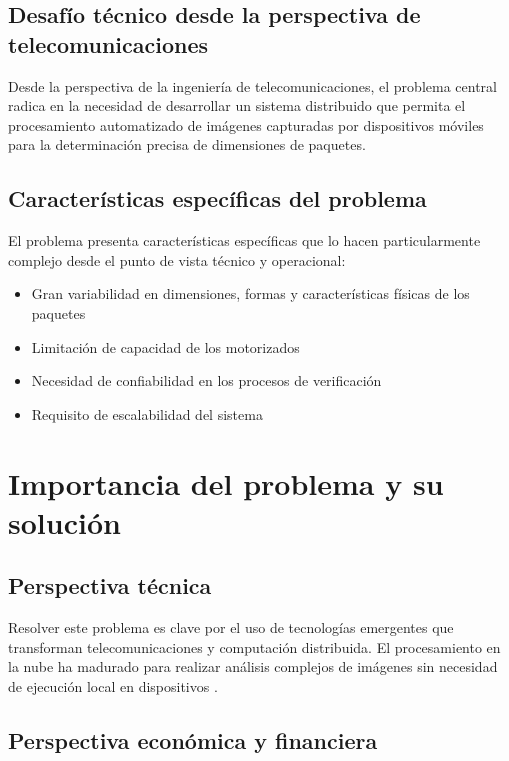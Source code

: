 \subsection{Desafío técnico desde la perspectiva de telecomunicaciones}

Desde la perspectiva de la ingeniería de telecomunicaciones, el problema central radica en la necesidad de desarrollar un sistema distribuido que permita el procesamiento automatizado de imágenes capturadas por dispositivos móviles para la determinación precisa de dimensiones de paquetes.

\subsection{Características específicas del problema}

El problema presenta características específicas que lo hacen particularmente complejo desde el punto de vista técnico y operacional:

\begin{itemize}
    \item Gran variabilidad en dimensiones, formas y características físicas de los paquetes
    \item Limitación de capacidad de los motorizados
    \item Necesidad de confiabilidad en los procesos de verificación
    \item Requisito de escalabilidad del sistema
\end{itemize}

\section{Importancia del problema y su solución}

\subsection{Perspectiva técnica}

Resolver este problema es clave por el uso de tecnologías emergentes que transforman telecomunicaciones y computación distribuida. El procesamiento en la nube ha madurado para realizar análisis complejos de imágenes sin necesidad de ejecución local en dispositivos \cite{Xu2012,Wang2012}.

\subsection{Perspectiva económica y financiera}

